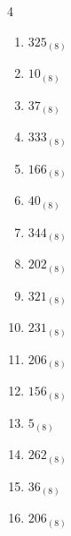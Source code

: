 \begin{multicols}{4}
\begin{enumerate}
  \item $325_{(8)}$

        \phantom{$=213$}

  \item $10_{(8)}$

        \phantom{$=8$}

  \item $37_{(8)}$

        \phantom{$=31$}

  \item $333_{(8)}$

        \phantom{$=219$}

  \item $166_{(8)}$

        \phantom{$=118$}

  \item $40_{(8)}$

        \phantom{$=32$}

  \item $344_{(8)}$

        \phantom{$=228$}

  \item $202_{(8)}$

        \phantom{$=130$}

  \item $321_{(8)}$

        \phantom{$=209$}

  \item $231_{(8)}$

        \phantom{$=153$}

  \item $206_{(8)}$

        \phantom{$=134$}

  \item $156_{(8)}$

        \phantom{$=110$}

  \item $5_{(8)}$

        \phantom{$=5$}

  \item $262_{(8)}$

        \phantom{$=178$}

  \item $36_{(8)}$

        \phantom{$=30$}

\columnbreak %

  \item $206_{(8)}$


\end{enumerate}
\end{multicols}
